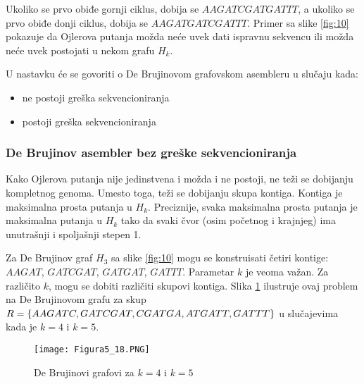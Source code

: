 \documentclass[12pt,oneside]{memoir}
\begin{document}
\noindent Ukoliko se prvo obiđe gornji ciklus, dobija se $AAGATCGATGATTT$, a ukoliko se prvo obiđe donji ciklus, dobija se $AAGATGATCGATTT$. Primer sa slike \ref{fig:10} pokazuje da Ojlerova putanja možda neće uvek dati ispravnu sekvencu ili možda neće uvek postojati u nekom grafu $H_k$.

U nastavku će se govoriti o De Brujinovom grafovskom asembleru u slučaju kada:
\begin{itemize}
\itemsep0em 
    \item{ne postoji greška sekvencioniranja}
    \item{postoji greška sekvencioniranja}
\end{itemize}

\subsubsection{De Brujinov asembler bez greške sekvencioniranja}

Kako Ojlerova putanja nije jedinstvena i možda i ne postoji, ne teži se dobijanju kompletnog genoma. Umesto toga, teži se dobijanju skupa kontiga. Kontiga je maksimalna prosta putanja u $H_k$. Preciznije, svaka maksimalna prosta putanja je maksimalna putanja u $H_k$ tako da svaki čvor (osim početnog i krajnjeg) ima unutrašnji i spoljašnji stepen 1. 

\begin{comment}
Slika \ref{fig:11} daje pseudokod ovog jednostavnog metoda.


\begin{figure}[!ht]
\centering
\texttt{[image: Figura5\_17.PNG]}
\caption{Jednstavan De Brujinov grafovski asmbler \cite{WingKinSung}}
\label{fig:11}
\end{figure}

\end{comment}

Za De Brujinov graf $H_3$ sa slike \ref{fig:10} mogu se konstruisati četiri kontige: $AAGAT$, $GATCGAT$, $GATGAT$, $GATTT$. Parametar $k$ je veoma važan. Za različito $k$, mogu se dobiti različiti skupovi kontiga. Slika \ref{fig:12} ilustruje ovaj problem na De Brujinovom grafu za skup $R = \{AAGATC, GATCGAT, CGATGA, ATGATT,\\ GATTT\}$ u slučajevima kada je $k = 4$ i $k = 5$.

\begin{figure}[!ht]
\centering
\texttt{[image: Figura5\_18.PNG]}
\caption{De Brujinovi grafovi za $k = 4$ i $k = 5$ \cite{WingKinSung}}
\label{fig:12}
\end{figure}
\end{document}
